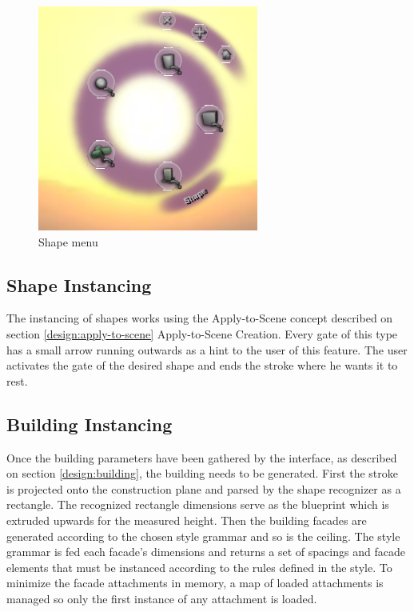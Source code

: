 \begin{figure}[ht]
	\centering
		\includegraphics[scale=0.5]{gfx/shape.png}
	\caption{Shape menu}
	\label{fig:shape}
\end{figure}


\subsection{Shape Instancing}

The instancing of shapes works using the Apply-to-Scene concept described on section \ref{design:apply-to-scene} Apply-to-Scene Creation.
Every gate of this type has a small arrow running outwards as a hint to the user of this feature.
The user activates the gate of the desired shape and ends the stroke where he wants it to rest.



\subsection{Building Instancing}

Once the building parameters have been gathered by the interface, as described on section \ref{design:building},
the building needs to be generated.
First the stroke is projected onto the construction plane and parsed by the shape recognizer as a rectangle.
The recognized rectangle dimensions serve as the blueprint which is extruded upwards for the measured height.
Then the building facades are generated according to the chosen style grammar and so is the ceiling.
The style grammar is fed each facade's dimensions and returns a set of spacings and facade elements that must be instanced
according to the rules defined in the style.
To minimize the facade attachments in memory, a map of loaded attachments is managed so only the first instance of any
attachment is loaded.


